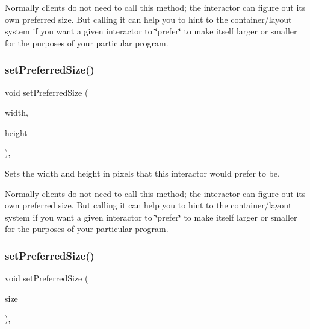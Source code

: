 Normally clients do not need to call this method; the interactor can figure out its own preferred size. But calling it can help you to hint to the container/layout system if you want a given interactor to \char`\"{}prefer\char`\"{} to make itself larger or smaller for the purposes of your particular program. \mbox{\label{classsgl_1_1GInteractor_a042c5ae19430d765ef552371cae3632c}} 
\subsubsection{\texorpdfstring{set\+Preferred\+Size()}{setPreferredSize()}\hspace{0.1cm}{\footnotesize\ttfamily [1/2]}}
{\footnotesize\ttfamily void set\+Preferred\+Size (\begin{DoxyParamCaption}\item[{double}]{width,  }\item[{double}]{height }\end{DoxyParamCaption})\hspace{0.3cm}{\ttfamily [virtual]}, {\ttfamily [inherited]}}



Sets the width and height in pixels that this interactor would prefer to be. 

Normally clients do not need to call this method; the interactor can figure out its own preferred size. But calling it can help you to hint to the container/layout system if you want a given interactor to \char`\"{}prefer\char`\"{} to make itself larger or smaller for the purposes of your particular program. \mbox{\label{classsgl_1_1GInteractor_aa22d9be4bc0e078bb0ea69b0fc9d7c75}} 
\subsubsection{\texorpdfstring{set\+Preferred\+Size()}{setPreferredSize()}\hspace{0.1cm}{\footnotesize\ttfamily [2/2]}}
{\footnotesize\ttfamily void set\+Preferred\+Size (\begin{DoxyParamCaption}\item[{const \mbox{\hyperlink{structsgl_1_1GDimension}{G\+Dimension}} \&}]{size }\end{DoxyParamCaption})\hspace{0.3cm}{\ttfamily [virtual]}, {\ttfamily [inherited]}}



